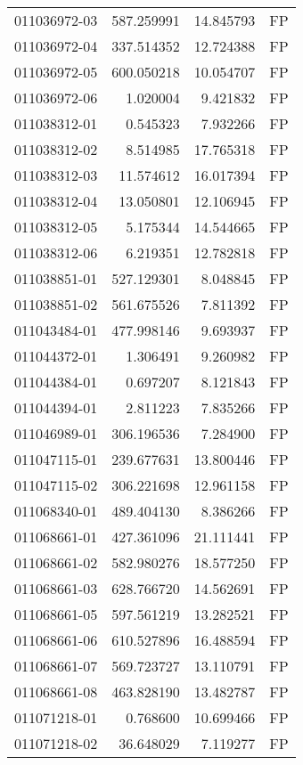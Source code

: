 \begin{tabular}{lrrl}
011036972-03 &  587.259991 &    14.845793 &   FP \\
011036972-04 &  337.514352 &    12.724388 &   FP \\
011036972-05 &  600.050218 &    10.054707 &   FP \\
011036972-06 &    1.020004 &     9.421832 &   FP \\
011038312-01 &    0.545323 &     7.932266 &   FP \\
011038312-02 &    8.514985 &    17.765318 &   FP \\
011038312-03 &   11.574612 &    16.017394 &   FP \\
011038312-04 &   13.050801 &    12.106945 &   FP \\
011038312-05 &    5.175344 &    14.544665 &   FP \\
011038312-06 &    6.219351 &    12.782818 &   FP \\
011038851-01 &  527.129301 &     8.048845 &   FP \\
011038851-02 &  561.675526 &     7.811392 &   FP \\
011043484-01 &  477.998146 &     9.693937 &   FP \\
011044372-01 &    1.306491 &     9.260982 &   FP \\
011044384-01 &    0.697207 &     8.121843 &   FP \\
011044394-01 &    2.811223 &     7.835266 &   FP \\
011046989-01 &  306.196536 &     7.284900 &   FP \\
011047115-01 &  239.677631 &    13.800446 &   FP \\
011047115-02 &  306.221698 &    12.961158 &   FP \\
011068340-01 &  489.404130 &     8.386266 &   FP \\
011068661-01 &  427.361096 &    21.111441 &   FP \\
011068661-02 &  582.980276 &    18.577250 &   FP \\
011068661-03 &  628.766720 &    14.562691 &   FP \\
011068661-05 &  597.561219 &    13.282521 &   FP \\
011068661-06 &  610.527896 &    16.488594 &   FP \\
011068661-07 &  569.723727 &    13.110791 &   FP \\
011068661-08 &  463.828190 &    13.482787 &   FP \\
011071218-01 &    0.768600 &    10.699466 &   FP \\
011071218-02 &   36.648029 &     7.119277 &   FP \\

\end{tabular}
